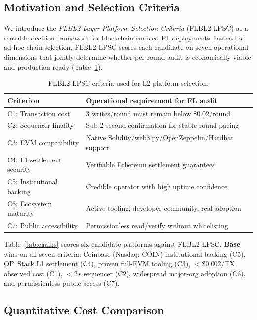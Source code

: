\documentclass{llncs}
\begin{document}
\subsection{Motivation and Selection Criteria}
We introduce the \emph{FLBL2 Layer Platform Selection Criteria} (FLBL2-LPSC)
as a reusable decision framework for blockchain-enabled FL deployments.
Instead of ad-hoc chain selection, FLBL2-LPSC scores each candidate on seven
operational dimensions that jointly determine whether per-round audit is
economically viable and production-ready (Table~\ref{tab:lpsc_criteria}).

\begin{table}[t]
\caption{FLBL2-LPSC criteria used for L2 platform selection.}
\label{tab:lpsc_criteria}
\centering\footnotesize
\setlength{\tabcolsep}{4pt}
\begin{tabular}{ll}
\toprule
\textbf{Criterion} & \textbf{Operational requirement for FL audit} \\
\midrule
C1: Transaction cost & 3 writes/round must remain below \$0.02/round \\
C2: Sequencer finality & Sub-2-second confirmation for stable round pacing \\
C3: EVM compatibility & Native Solidity/web3.py/OpenZeppelin/Hardhat support \\
C4: L1 settlement security & Verifiable Ethereum settlement guarantees \\
C5: Institutional backing & Credible operator with high uptime confidence \\
C6: Ecosystem maturity & Active tooling, developer community, real adoption \\
C7: Public accessibility & Permissionless read/verify without whitelisting \\
\bottomrule
\end{tabular}
\end{table}

Table~\ref{tab:chains} scores six candidate platforms against FLBL2-LPSC.
\textbf{Base} wins on all seven criteria: Coinbase (Nasdaq: COIN) institutional backing
(C5), OP~Stack L1 settlement (C4), proven full-EVM tooling (C3),
$<$\$0.002/TX observed cost (C1), $<$2\,s sequencer (C2),
widespread major-org adoption (C6), and permissionless public access (C7).

\subsection{Quantitative Cost Comparison}
\end{document}

